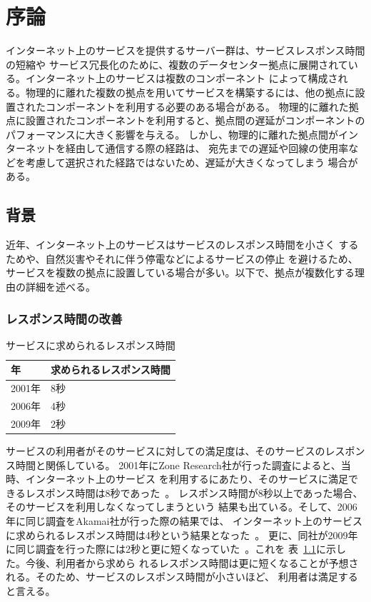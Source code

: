 \chapter{序論}
\label{background}

インターネット上のサービスを提供するサーバー群は、サービスレスポンス時間の短縮や
サービス冗長化のために、複数のデータセンター拠点に展開されている。インターネット上のサービスは複数のコンポーネント
によって構成される。物理的に離れた複数の拠点を用いてサービスを構築するには、他の拠点に設置されたコンポーネントを利用する必要のある場合がある。
物理的に離れた拠点に設置されたコンポーネントを利用すると、拠点間の遅延がコンポーネントのパフォーマンスに大きく影響を与える。
しかし、物理的に離れた拠点間がインターネットを経由して通信する際の経路は、
宛先までの遅延や回線の使用率などを考慮して選択された経路ではないため、遅延が大きくなってしまう
場合がある。

\section{背景}
\label{background:multilocation}

近年、インターネット上のサービスはサービスのレスポンス時間を小さく
するためや、自然災害やそれに伴う停電などによるサービスの停止
を避けるため、サービスを複数の拠点に設置している場合が多い。以下で、拠点が複数化する理由の詳細を述べる。

\subsection{レスポンス時間の改善}
\label{background:ml1}

\begin{table}[tb]
	\begin{center}
		\caption{サービスに求められるレスポンス時間}
		\begin{tabular}{|l|l|}
			\hline
				年 & 求められるレスポンス時間 \\
			\hline
				2001年 & 8秒 \\
				2006年 & 4秒 \\
				2009年 & 2秒 \\
			\hline
		\end{tabular}
		\label{table:responsetime}
	\end{center}
\end{table}

サービスの利用者がそのサービスに対しての満足度は、そのサービスのレスポンス時間と関係している。
2001年にZone Research社が行った調査によると、当時、インターネット上のサービス
を利用するにあたり、そのサービスに満足できるレスポンス時間は8秒であった~\cite{zonaresearch}。
レスポンス時間が8秒以上であった場合、そのサービスを利用しなくなってしまうという
結果も出ている。そして、2006年に同じ調査をAkamai社が行った際の結果では、
インターネット上のサービスに求められるレスポンス時間は4秒という結果となった~\cite{akamai4sec}。
更に、同社が2009年に同じ調査を行った際には2秒と更に短くなっていた~\cite{acm:sigops}。これを
表~\ref{table:responsetime}に示した。今後、利用者から求めら
れるレスポンス時間は更に短くなることが予想される。そのため、サービスのレスポンス時間が小さいほど、
利用者は満足すると言える。

